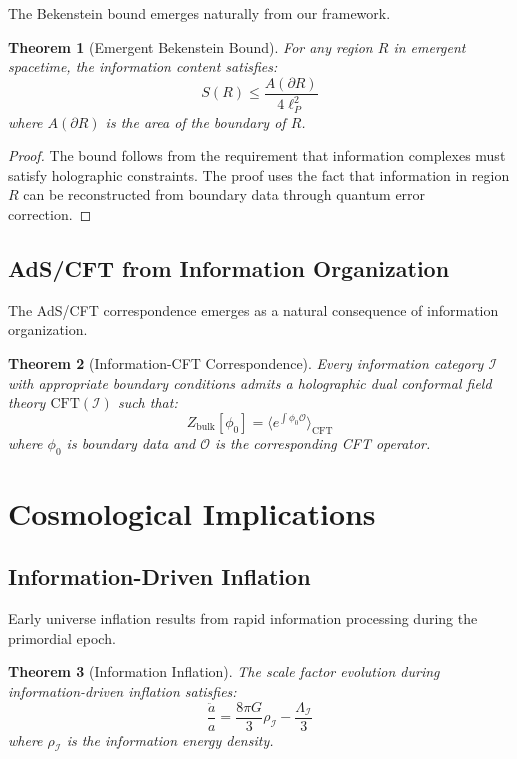 \documentclass{article}
\newtheorem{theorem}{Theorem}[section]
\begin{document}
The Bekenstein bound emerges naturally from our framework.

\begin{theorem}[Emergent Bekenstein Bound]
For any region $R$ in emergent spacetime, the information content satisfies:
\begin{equation}
S(R) \leq \frac{A(\partial R)}{4\ell_P^2}
\end{equation}
where $A(\partial R)$ is the area of the boundary of $R$.
\end{theorem}

\begin{proof}
The bound follows from the requirement that information complexes must satisfy holographic constraints. The proof uses the fact that information in region $R$ can be reconstructed from boundary data through quantum error correction.
\end{proof}

\subsection{AdS/CFT from Information Organization}

The AdS/CFT correspondence emerges as a natural consequence of information organization.

\begin{theorem}[Information-CFT Correspondence]
Every information category $\mathcal{I}$ with appropriate boundary conditions admits a holographic dual conformal field theory $\text{CFT}(\mathcal{I})$ such that:
\begin{equation}
Z_{\text{bulk}}[\phi_0] = \langle e^{\int \phi_0 \mathcal{O}} \rangle_{\text{CFT}}
\end{equation}
where $\phi_0$ is boundary data and $\mathcal{O}$ is the corresponding CFT operator.
\end{theorem}

\section{Cosmological Implications}

\subsection{Information-Driven Inflation}

Early universe inflation results from rapid information processing during the primordial epoch.

\begin{theorem}[Information Inflation]
The scale factor evolution during information-driven inflation satisfies:
\begin{equation}
\frac{\ddot{a}}{a} = \frac{8\pi G}{3} \rho_{\mathcal{I}} - \frac{\Lambda_{\mathcal{I}}}{3}
\end{equation}
where $\rho_{\mathcal{I}}$ is the information energy density.
\end{theorem}
\end{document}
